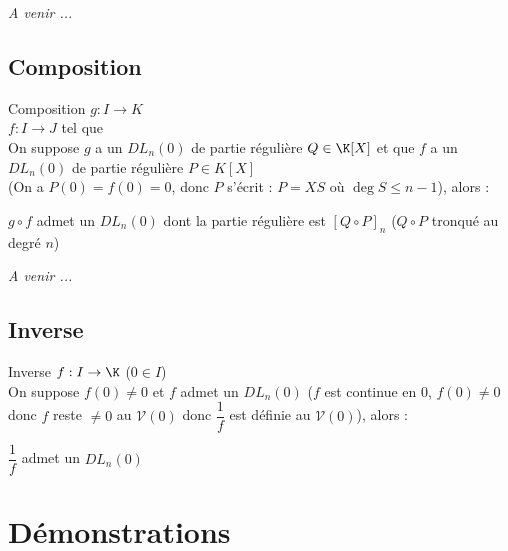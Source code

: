 \documentclass[12pt,a4paper]{report}
\begin{document}
\begin{exemple}
\textit{A venir ...}
\end{exemple}

\subsection{Composition}
\begin{proposition}{Composition}{}
$g:I \to K$\\
$f:I \to J$ tel que \\
On suppose $g$ a un $DL_n (0)$ de partie régulière $Q \in \K[X]$ et que $f$ a un $DL_n (0)$ de partie régulière $P \in K[X]$\\
(On a $P(0)=f(0)=0$, donc $P$ s'écrit : $P=XS$ où $\deg S \leq n-1$), alors :
\begin{center}
    $g\circ f$ admet un $DL_n(0)$ dont la partie régulière est $[Q \circ P]_n$ ($Q\circ P$ tronqué au degré $n$)
\end{center}
\end{proposition}

\begin{demo}
\textit{A venir ...}
\end{demo}

\pagebreak

\subsection{Inverse}
\begin{proposition}{Inverse}{}
$f:I\to \K$ ($0 \in I$)\\
On suppose $f(0) \neq 0$ et $f$ admet un $DL_n (0)$ ($f$ est continue en 0, $f(0) \neq 0$ donc $f$ reste $\neq 0$ au $\mathcal{V}(0)$ donc $\dfrac{1}{f}$ est définie au $\mathcal{V}(0)$), alors : 
\begin{center}
    $\dfrac{1}{f}$ admet un $DL_n (0)$
\end{center}
\end{proposition}

\pagebreak

\section*{Démonstrations}
\end{document}
